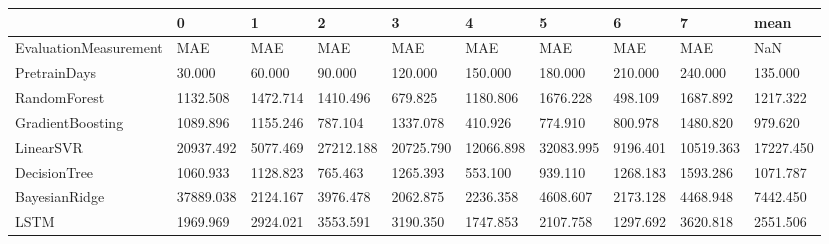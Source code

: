 \begin{tabular}{llllllllll}
\toprule
{} &         0 &        1 &         2 &         3 &         4 &         5 &        6 &         7 &      mean \\
\midrule
EvaluationMeasurement &       MAE &      MAE &       MAE &       MAE &       MAE &       MAE &      MAE &       MAE &       NaN \\
PretrainDays          &    30.000 &   60.000 &    90.000 &   120.000 &   150.000 &   180.000 &  210.000 &   240.000 &   135.000 \\
RandomForest          &  1132.508 & 1472.714 &  1410.496 &   679.825 &  1180.806 &  1676.228 &  498.109 &  1687.892 &  1217.322 \\
GradientBoosting      &  1089.896 & 1155.246 &   787.104 &  1337.078 &   410.926 &   774.910 &  800.978 &  1480.820 &   979.620 \\
LinearSVR             & 20937.492 & 5077.469 & 27212.188 & 20725.790 & 12066.898 & 32083.995 & 9196.401 & 10519.363 & 17227.450 \\
DecisionTree          &  1060.933 & 1128.823 &   765.463 &  1265.393 &   553.100 &   939.110 & 1268.183 &  1593.286 &  1071.787 \\
BayesianRidge         & 37889.038 & 2124.167 &  3976.478 &  2062.875 &  2236.358 &  4608.607 & 2173.128 &  4468.948 &  7442.450 \\
LSTM                  &  1969.969 & 2924.021 &  3553.591 &  3190.350 &  1747.853 &  2107.758 & 1297.692 &  3620.818 &  2551.506 \\
\bottomrule
\end{tabular}
